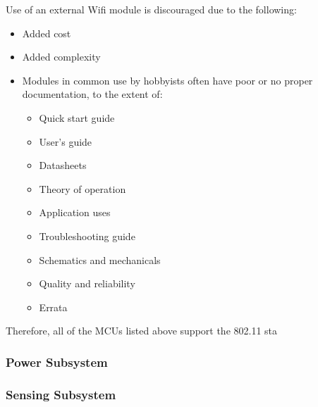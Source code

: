 \begin{flushleft}
    Use of an external Wifi module is discouraged due to the following:
    \begin{itemize}
        \item Added cost
        \item Added complexity
        \item Modules in common use by hobbyists often have poor or no proper documentation, to the
        extent of:
        \begin{itemize}
            \item Quick start guide
            \item User's guide
            \item Datasheets
            \item Theory of operation
            \item Application uses
            \item Troubleshooting guide
            \item Schematics and mechanicals
            \item Quality and reliability
            \item Errata
        \end{itemize}
    \end{itemize}
    Therefore, all of the MCUs listed above support the 802.11 sta
\end{flushleft}

\subsubsection{Power Subsystem}
\subsubsection{Sensing Subsystem}
